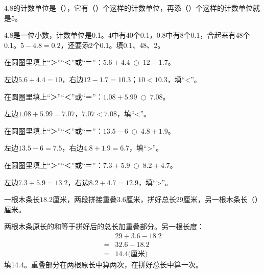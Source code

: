 \(4.8\)的计数单位是（\hspace{1.8em}），它有（\hspace{1.8em}）个这样的计数单位，再添（\hspace{1.8em}）个这样的计数单位就是5。\par
\begin{BookAnswer}
4.8是一位小数，计数单位是0.1。4中有40个0.1，0.8中有8个0.1，合起来有48个0.1。\(5-4.8=0.2\)，还要添2个0.1。填0.1、48、2。
\end{BookAnswer}

在圆圈里填上“＞”“＜”或“＝”：\(5.6+4.4\ \bigcirc\ 12-1.7\)。\par
\begin{BookAnswer}
左边\(5.6+4.4=10\)，右边\(12-1.7=10.3\)；\allowbreak{}\(10<10.3\)，填“<”。
\end{BookAnswer}

在圆圈里填上“＞”“＜”或“＝”：\(1.08+5.99\ \bigcirc\ 7.08\)。\par
\begin{BookAnswer}
左边\(1.08+5.99=7.07\)，\allowbreak{}\(7.07<7.08\)，填“<”。
\end{BookAnswer}

在圆圈里填上“＞”“＜”或“＝”：\(13.5-6\ \bigcirc\ 4.8+1.9\)。\par
\begin{BookAnswer}
左边\(13.5-6=7.5\)，右边\(4.8+1.9=6.7\)，填“>”。
\end{BookAnswer}

在圆圈里填上“＞”“＜”或“＝”：\(7.3+5.9\ \bigcirc\ 8.2+4.7\)。\par
\begin{BookAnswer}
左边\(7.3+5.9=13.2\)，右边\(8.2+4.7=12.9\)，填“>”。
\end{BookAnswer}

一根木条长\(18.2\)厘米，两段拼接重叠\(3.6\)厘米，拼好总长29厘米，另一根木条长（\hspace{1.8em}）厘米。\par
\begin{BookAnswer}
两根木条原长的和等于拼好后的总长加重叠部分。另一根长度：\[\begin{aligned}&29+3.6-18.2\\={}&32.6-18.2\\={}&14.4\text{(厘米)}\end{aligned}\]填14.4。重叠部分在两根原长中算两次，在拼好总长中算一次。
\end{BookAnswer}

